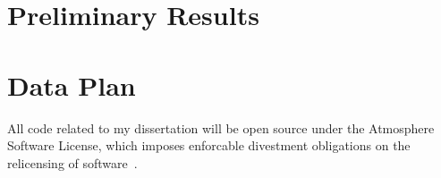 \documentclass{article}
\begin{document}
\section{Preliminary Results}


\section{Data Plan}

All code related to my dissertation will be open source under the Atmosphere Software License, which imposes enforcable divestment obligations on the relicensing of software~\cite{atmospherelicense}. 


\end{document}
